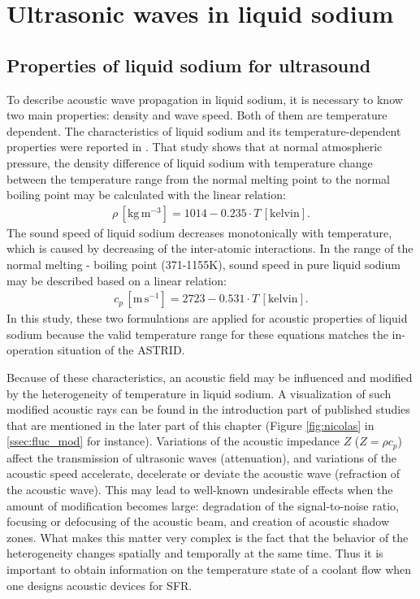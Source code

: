 \section{Ultrasonic waves in liquid sodium}

\subsection{Properties of liquid sodium for ultrasound} \label{ssec:ac_char}

    To describe acoustic wave propagation in liquid sodium, it is necessary to know two main properties: density and wave speed. Both of them are temperature dependent.
    The characteristics of liquid sodium and its temperature-dependent properties were reported in \cite{Sobolev2011Databaseofthermophysical}. That study shows
that at normal atmospheric pressure, the density difference of liquid sodium with temperature change between the temperature range from the normal melting
point to the normal boiling point may be calculated with the linear relation:
    \begin{align}\label{eq:I_1}
        \rho\,[ \text{kg} \, \text{m}^{-3} ]=1014-0.235\cdot T\,[ \text{kelvin} ].
    \end{align}
    The sound speed of liquid sodium decreases monotonically with temperature, which is caused by decreasing of the inter-atomic interactions. In the range
of the normal melting - boiling point (\num{371}-\num{1155}\textdegree{}\si{\kelvin}), sound speed in pure liquid sodium may be described based on a linear relation:
    \begin{align}\label{eq:I_2}
        c_p\, [\text{m}\, \text{s}^{-1}] = 2723-0.531\cdot T\,[\text{kelvin}].
    \end{align}
    In this study, these two formulations are applied for acoustic properties of liquid sodium because the valid temperature range for these equations matches
the in-operation situation of the ASTRID.

    Because of these characteristics, an acoustic field may be influenced and modified by the heterogeneity of temperature in liquid sodium.
    A visualization of such modified acoustic rays can be found in the introduction part of published studies that are mentioned in the later part of this chapter (Figure \ref{fig:nicolas} in \autoref{ssec:fluc_mod} for instance).
    Variations of the acoustic impedance $Z$ ($Z=\rho c_p$) affect the transmission of ultrasonic waves (attenuation), and variations of the acoustic speed accelerate, decelerate or deviate the acoustic wave (refraction of the acoustic wave). This may lead to well-known undesirable effects when the amount of modification becomes large: degradation of the signal-to-noise ratio, focusing or defocusing of the acoustic beam, and creation of acoustic shadow zones.
What makes this matter very complex is the fact that the behavior of the heterogeneity changes spatially and temporally at the same time. Thus it is important to obtain information on the temperature state of a coolant flow when one designs acoustic devices for SFR.

